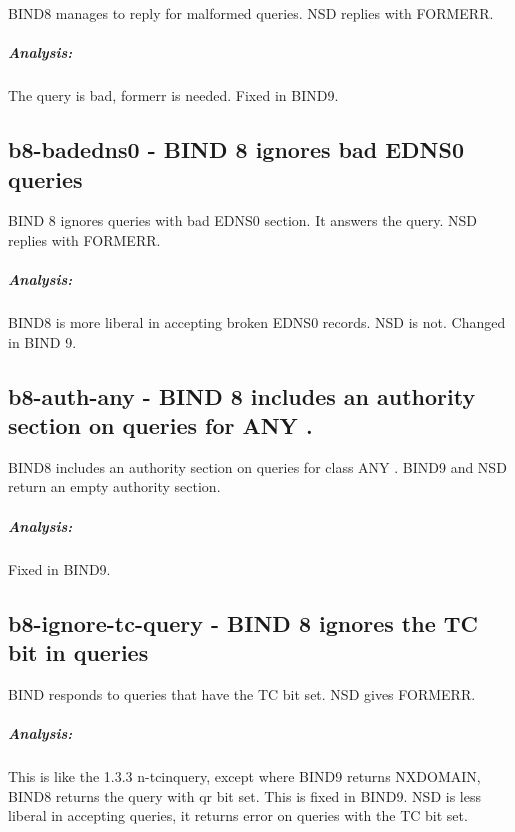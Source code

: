 \documentclass[twoside,titlepage,english]{nlnetlabs}
\begin{document}
BIND8 manages to reply for malformed queries. NSD replies with FORMERR.

\vspace{-8pt}\subparagraph{Analysis:}

The query is bad, formerr is needed. Fixed in BIND9.


\subsection{b8-badedns0 - BIND 8 ignores bad EDNS0 queries}
\label{b8-badedns0}

BIND 8 ignores queries with bad EDNS0 section. It answers the query.
NSD replies with FORMERR.

\vspace{-8pt}\subparagraph{Analysis:}

BIND8 is more liberal in accepting broken EDNS0 records. NSD is not.
Changed in BIND 9.


\subsection{b8-auth-any - BIND 8 includes an authority section on queries for ANY .}
\label{b8-auth-any}

BIND8 includes an authority section on queries for class ANY .
BIND9 and NSD return an empty authority section.

\vspace{-8pt}\subparagraph{Analysis:}

Fixed in BIND9.


\subsection{b8-ignore-tc-query - BIND 8 ignores the TC bit in queries}
\label{b8-ignore-tc-query}

BIND responds to queries that have the TC bit set. NSD gives FORMERR.

\vspace{-8pt}\subparagraph{Analysis:}

This is like the 1.3.3 n-tcinquery, except where BIND9 returns NXDOMAIN,
BIND8 returns the query with qr bit set. This is fixed in BIND9.
NSD is less liberal in accepting queries, it returns error on queries with
the TC bit set.



\end{document}
